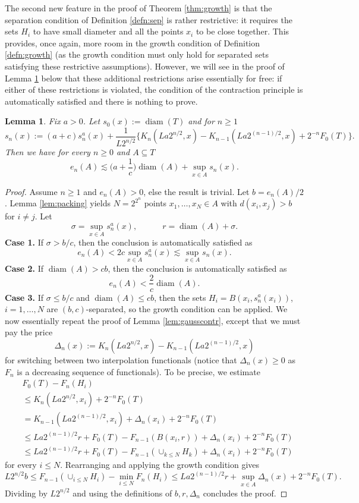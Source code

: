\documentclass[10pt,reqno]{amsart}
\newtheorem{lem}[thm]{Lemma}
\theoremstyle{definition}
\numberwithin{equation}{section}
\numberwithin{figure}{section}
\numberwithin{table}{section}
\newcommand{\diam}{\mathop{\mathrm{diam}}}
\begin{document}
The second new feature in the proof of Theorem \ref{thm:growth} is that 
the separation condition of Definition \ref{defn:sep} is rather 
restrictive: it requires the sets $H_i$ to have small diameter and all the 
points $x_i$ to be close together. This provides, once again, more room in 
the growth condition of Definition \ref{defn:growth} (as the growth 
condition must only hold for separated sets satisfying these restrictive 
assumptions). However, we will see in the proof of Lemma 
\ref{lem:growthcontr} below that these additional restrictions arise 
essentially for free: if either of these restrictions is violated, the 
condition of the contraction principle is automatically satisfied and 
there is nothing to prove.

\begin{lem}
\label{lem:growthcontr}
Fix $a>0$. Let $s_0(x):=\diam(T)$ and for $n\ge 1$
$$
	s_n(x) :=
	(a+c)s_n^a(x) + 
	\frac{1}{L2^{n/2}}\{
	K_n(La2^{n/2},x)-
	K_{n-1}(La2^{(n-1)/2},x)+
	2^{-n}F_0(T)\}.
$$
Then we have for every $n\ge 0$ and $A\subseteq T$
$$
        e_n(A) \lesssim \bigg(a+\frac{1}{c}\bigg)\diam(A)
		+ \sup_{x\in A}s_n(x).
$$
\end{lem}

\begin{proof}
Assume $n\ge 1$ and $e_n(A)>0$, else the result is trivial.
Let $b=e_n(A)/2$. Lemma \ref{lem:packing} yields $N=2^{2^n}$ points
$x_1,\ldots,x_N\in A$ with $d(x_i,x_j)>b$ for $i\ne j$.
Let
$$
	\sigma = \sup_{x\in A}s_n^a(x),\qquad\quad
	r = \diam(A)+\sigma.
$$
\textbf{Case 1.} If $\sigma> b/c$, then
the conclusion is automatically satisfied as
$$
	e_n(A) < 2c \sup_{x\in A}s_n^a(x) \lesssim 
	\sup_{x\in A} s_n(x).
$$
\textbf{Case 2.} If $\diam(A)> cb$, then
the conclusion is automatically satisfied as
$$
	e_n(A) < \frac{2}{c}\diam(A).
$$
\textbf{Case 3.} If $\sigma\le b/c$ and $\diam(A)\le cb$,
then the sets $H_i=B(x_i,s_n^a(x_i))$, $i=1,\ldots,N$ are
$(b,c)$-separated, so the growth condition can be applied.
We now essentially repeat the proof of Lemma \ref{lem:gausscontr}, except
that we must pay the price
$$
	\Delta_n(x) :=
	K_n(La2^{n/2},x)-K_{n-1}(La2^{(n-1)/2},x)
$$
for switching between two interpolation functionals (notice that 
$\Delta_n(x)\ge 0$ as $F_n$ is a decreasing sequence of functionals).
To be precise, we estimate
\begin{align*}
	&F_0(T) - F_n(H_i) \\
	&\le K_n(La2^{n/2},x_i) + 2^{-n}F_0(T) \\
	&=
	K_{n-1}(La2^{(n-1)/2},x_i) + \Delta_n(x_i)
	+ 2^{-n}F_0(T) \\
	&\le La2^{(n-1)/2}r + F_0(T) - F_{n-1}(B(x_i,r)) + 
	\Delta_n(x_i)
	+ 2^{-n}F_0(T) \\
	&\le La2^{(n-1)/2}r + F_0(T) - F_{n-1}(\cup_{k\le N}H_k) + 
	\Delta_n(x_i)
	+ 2^{-n}F_0(T)
\end{align*}
for every $i\le N$.
Rearranging and applying the growth condition gives
$$
	L2^{n/2}b \le
	F_{n-1}(\cup_{i\le N}H_i) - \min_{i\le N}F_n(H_i) 
	\le
	La2^{(n-1)/2}r +
	\sup_{x\in A}\Delta_n(x) + 2^{-n}F_0(T).
$$
Dividing by $L2^{n/2}$ and using
the definitions of $b,r,\Delta_n$ concludes the proof.
\end{proof}
\end{document}
